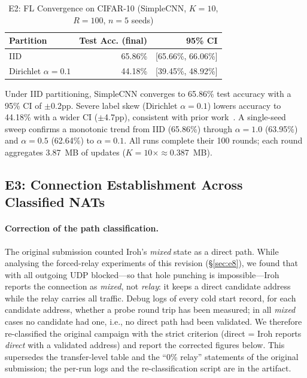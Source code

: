 \begin{table}[t]
\centering
\caption{E2: FL Convergence on CIFAR-10 (SimpleCNN, $K{=}10$, $R{=}100$, $n{=}5$ seeds)}
\label{tab:e2}
\footnotesize
\begin{tabular}{l r r}
\toprule
\textbf{Partition} & \textbf{Test Acc. (final)} & \textbf{95\% CI} \\
\midrule
IID                  & 65.86\% & [65.66\%, 66.06\%] \\
Dirichlet $\alpha{=}0.1$ & 44.18\% & [39.45\%, 48.92\%] \\
\bottomrule
\end{tabular}
\end{table}

Under IID partitioning, SimpleCNN converges to 65.86\% test accuracy with a 95\% CI of $\pm$0.2pp. Severe label skew (Dirichlet $\alpha{=}0.1$) lowers accuracy to 44.18\% with a wider CI ($\pm$4.7pp), consistent with prior work~\cite{li2020federated,scaffold2020}. A single-seed sweep confirms a monotonic trend from IID (65.86\%) through $\alpha{=}1.0$ (63.95\%) and $\alpha{=}0.5$ (62.64\%) to $\alpha{=}0.1$. All runs complete their 100 rounds; each round aggregates 3.87~MB of updates ($K{=}10 \times \approx$0.387~MB).

\subsection{E3: Connection Establishment Across Classified NATs}
\label{sec:e3}

\paragraph{Correction of the path classification.} The original submission counted Iroh's \emph{mixed} state as a direct path. While analysing the forced-relay experiments of this revision (\S\ref{sec:e8}), we found that with all outgoing UDP blocked---so that hole punching is impossible---Iroh reports the connection as \emph{mixed}, not \emph{relay}: it keeps a direct candidate address while the relay carries all traffic. Debug logs of every cold start record, for each candidate address, whether a probe round trip has been measured; in all \emph{mixed} cases no candidate had one, i.e., no direct path had been validated. We therefore re-classified the original campaign with the strict criterion (direct = Iroh reports \emph{direct} with a validated address) and report the corrected figures below. This supersedes the transfer-level table and the ``0\% relay'' statements of the original submission; the per-run logs and the re-classification script are in the artifact.

